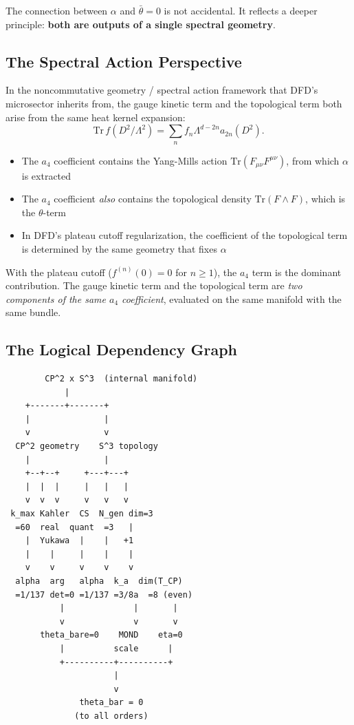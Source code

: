 \documentclass[11pt]{article}
\theoremstyle{remark}
\begin{document}
The connection between $\alpha$ and $\bar\theta = 0$ is not accidental.
It reflects a deeper principle: \textbf{both are outputs of a single
spectral geometry}.

\subsection{The Spectral Action Perspective}

In the noncommutative geometry / spectral action framework that DFD's
microsector inherits from, the gauge kinetic term and the topological term
both arise from the same heat kernel expansion:
\begin{equation}
\mathrm{Tr}\, f(D^2/\Lambda^2) = \sum_n f_n \Lambda^{d-2n} a_{2n}(D^2).
\end{equation}

\begin{itemize}
\item The $a_4$ coefficient contains the Yang-Mills action
  $\mathrm{Tr}(F_{\mu\nu}F^{\mu\nu})$, from which $\alpha$ is extracted
\item The $a_4$ coefficient \emph{also} contains the topological density
  $\mathrm{Tr}(F \wedge F)$, which is the $\theta$-term
\item In DFD's plateau cutoff regularization, the coefficient of the
  topological term is determined by the same geometry that fixes $\alpha$
\end{itemize}

With the plateau cutoff ($f^{(n)}(0) = 0$ for $n \geq 1$), the $a_4$ term
is the dominant contribution.  The gauge kinetic term and the topological term
are \emph{two components of the same $a_4$ coefficient}, evaluated on the
same manifold with the same bundle.

\subsection{The Logical Dependency Graph}

\begin{verbatim}
        CP^2 x S^3  (internal manifold)
            |
    +-------+-------+
    |               |
    v               v
  CP^2 geometry    S^3 topology
    |               |
    +--+--+     +---+---+
    |  |  |     |   |   |
    v  v  v     v   v   v
 k_max Kahler  CS  N_gen dim=3
  =60  real  quant  =3   |
    |  Yukawa  |    |   +1
    |    |     |    |    |
    v    v     v    v    v
  alpha  arg   alpha  k_a  dim(T_CP)
  =1/137 det=0 =1/137 =3/8a  =8 (even)
           |              |       |
           v              v       v
       theta_bare=0    MOND    eta=0
           |          scale      |
           +----------+----------+
                      |
                      v
               theta_bar = 0
              (to all orders)
\end{verbatim}
\end{document}
